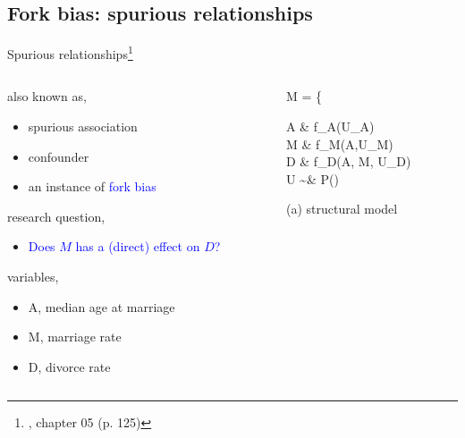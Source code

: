 \subsection{Fork bias: spurious relationships}
%
%
\begin{frame}[t, negative]
	\subsectionpage
\end{frame}
%
%
\begin{frame}
	{Spurious relationships\footnote{\citet{McElreath_2020}, chapter 05 (p. 125)}}
	\begin{columns}
		\begin{column}{0.5\textwidth}
			also known as,
			\begin{itemize}
				\item spurious association
				\item confounder
				\item an instance of \textcolor{blue}{fork bias}
			\end{itemize}
			
			research question, 
			\begin{itemize}
				\item \textcolor{blue}{Does $M$ has a (direct) effect on $D$?}
			\end{itemize}
			
			variables,
			\begin{itemize}
				\item A, median age at marriage
				\item M, marriage rate
				\item D, divorce rate
			\end{itemize}
		\end{column}
		\begin{column}{0.5\textwidth}  
			\begin{equ}
				M = \left\{ \begin{aligned} 
					A \leftarrow & \; f_{A}(U_{A}) \\
					M \leftarrow & \; f_{M}(A,U_{M}) \\
					D \leftarrow & \; f_{D}(A, M, U_{D}) \\
					U \sim & \; P()
				\end{aligned} \right
				\caption*{(a) structural model}
			\end{equ}
			\begin{figure}
\end{figure}
\end{column}
\end{columns}
\end{frame}
